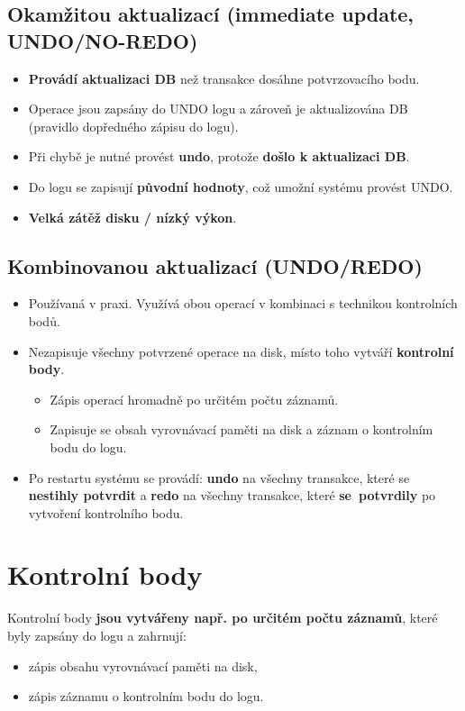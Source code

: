 \subsection*{Okamžitou aktualizací (immediate update, UNDO/NO-REDO)}
\begin{itemize}
    \item \textbf{Provádí aktualizaci DB} než transakce dosáhne potvrzovacího bodu.
    \item Operace jsou zapsány do UNDO logu a zároveň je aktualizována DB (pravidlo dopředného zápisu do logu).
    \item Při chybě je nutné provést \textbf{undo}, protože \textbf{došlo k aktualizaci DB}.
    \item Do logu se zapisují \textbf{původní hodnoty}, což umožní systému provést UNDO.
    \item \textbf{Velká zátěž disku / nízký výkon}.
\end{itemize}
\subsection*{Kombinovanou aktualizací (UNDO/REDO)}
\begin{itemize}
    \item Používaná v praxi. Využívá obou operací v kombinaci s technikou kontrolních bodů.
    \item Nezapisuje všechny potvrzené operace na disk, místo toho vytváří \textbf{kontrolní body}.
          \begin{itemize}
              \item Zápis operací hromadně po určitém počtu záznamů.
              \item Zapisuje se obsah vyrovnávací paměti na disk a záznam o kontrolním bodu do logu.
          \end{itemize}
    \item Po restartu systému se provádí: \textbf{undo} na všechny transakce, které se \textbf{nestihly potvrdit} a \textbf{redo} na všechny transakce, které \textbf{se potvrdily} po vytvoření kontrolního bodu.
\end{itemize}

\section{Kontrolní body}
Kontrolní body \textbf{jsou vytvářeny např. po určitém počtu záznamů}, které byly zapsány do logu a zahrnují:
\begin{itemize}
    \item zápis obsahu vyrovnávací paměti na disk,
    \item zápis záznamu o kontrolním bodu do logu.
\end{itemize}


